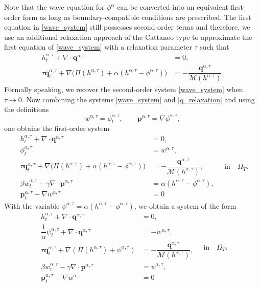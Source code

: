 \documentclass[11pt]{article}
\numberwithin{equation}{section}
\newtheorem{counter example}[theorem]{Counter Example}
\numberwithin{equation}{section}
\numberwithin{equation}{section}
\newcommand{\rel}{^{\alpha, \tau}}
\begin{document}
Note that the wave equation for $\phi^{\alpha}$ can be converted into an equivalent first-order form as long as boundary-compatible conditions are prescribed. The first equation in \eqref{wave_system} still possesses second-order terms and therefore, we use an additional relaxation approach of the Cattaneo type \cite{cattaneo1948sulla} to approximate the first equation of \eqref{wave_system} with a relaxation parameter $\tau$ such that
\begin{equation}\label{q_relaxation}
\begin{aligned}
    h^{\alpha, \tau}_t+\nabla\cdot \mathbf{q}^{\alpha, \tau}&=0,\\
    \tau \mathbf{q}^{\alpha, \tau}_t+\nabla\big(\Pi(h^{\alpha, \tau})+\alpha(h^{\alpha, \tau}-\phi^{\alpha, \tau})\big)&=-\dfrac{\mathbf{q}^{\alpha, \tau}}{\mathcal{M}(h^{\alpha, \tau})}.  
\end{aligned}
\end{equation}
Formally speaking, we recover the second-order system \eqref{wave_system} when $\tau\rightarrow 0$. Now combining the systems \eqref{wave_system} and \eqref{q_relaxation} and using the definitions
\[w^{\alpha, \tau}=\phi^{\alpha, \tau}_t,\quad \quad \mathbf{p}^{\alpha, \tau}=\nabla \phi^{\alpha, \tau},\] 
one obtains the first-order system
\begin{equation*}\label{hyperbolic_system_new}
\begin{aligned}
    h^{\alpha, \tau}_t+\nabla\cdot \mathbf{q}^{\alpha, \tau}&=0,\\
     \phi^{\alpha, \tau}_t&=w^{\alpha, \tau},\\
    \tau \mathbf{q}^{\alpha, \tau}_t+\nabla\big(\Pi(h^{\alpha, \tau})+\alpha(h^{\alpha, \tau}-\phi^{\alpha, \tau})\big)&=-\dfrac{\mathbf{q}^{\alpha, \tau}}{\mathcal{M}(h^{\alpha, \tau})},\\
    \beta w^{\alpha, \tau}_t-\gamma \nabla\cdot \mathbf{p}^{\alpha, \tau}&=\alpha(h^{\alpha, \tau}-\phi^{\alpha, \tau}),\\
    \mathbf{p}^{\alpha, \tau}_t-\nabla w^{\alpha, \tau}&=0
\end{aligned}\quad \mathrm{in}\quad \Omega_T.
\end{equation*}
With the variable $\psi^{\alpha, \tau}=\alpha(h^{\alpha, \tau}-\phi^{\alpha, \tau})$, we obtain a system of the form
\begin{equation}\label{hyperbolic_system}
\begin{aligned}
     h^{\alpha, \tau}_t+\nabla\cdot \mathbf{q}^{\alpha, \tau}&=0,\\
     \dfrac{1}{\alpha}\psi^{\alpha, \tau}_t+\nabla\cdot \mathbf{q}^{\alpha, \tau}&=-w\rel,\\
     \tau\mathbf{q}^{\alpha, \tau}_t+\nabla(\Pi(h^{\alpha, \tau})+\psi^{\alpha, \tau})&=-\dfrac{\mathbf{q}^{\alpha, \tau}}{\mathcal{M}(h^{\alpha, \tau})},\\
    \beta w^{\alpha, \tau}_t-\gamma \nabla\cdot \mathbf{p}^{\alpha, \tau}&=\psi^{\alpha, \tau},\\
    \mathbf{p}^{\alpha, \tau}_t-\nabla w^{\alpha, \tau}&=0
\end{aligned} \quad \mathrm{in}\quad \Omega_T.
\end{equation}
\end{document}

